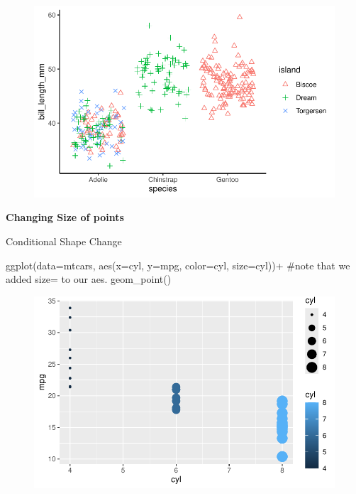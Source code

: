 \documentclass[
  letterpaper,
  DIV=11,
  numbers=noendperiod]{scrartcl}
\newenvironment{Shaded}{\begin{snugshade}}{\end{snugshade}}
\newcommand{\AttributeTok}[1]{\textcolor[rgb]{0.40,0.45,0.13}{#1}}
\newcommand{\CommentTok}[1]{\textcolor[rgb]{0.37,0.37,0.37}{#1}}
\newcommand{\FunctionTok}[1]{\textcolor[rgb]{0.28,0.35,0.67}{#1}}
\newcommand{\NormalTok}[1]{\textcolor[rgb]{0.00,0.23,0.31}{#1}}
\newcommand{\SpecialCharTok}[1]{\textcolor[rgb]{0.37,0.37,0.37}{#1}}
\begin{document}
\begin{figure}[H]

{\centering \includegraphics{Lab_2_files/figure-pdf/unnamed-chunk-30-1.pdf}

}

\end{figure}

\textbf{Changing Size of points}

Conditional Shape Change

\begin{Shaded}
\begin{Highlighting}[]
\FunctionTok{ggplot}\NormalTok{(}\AttributeTok{data=}\NormalTok{mtcars, }\FunctionTok{aes}\NormalTok{(}\AttributeTok{x=}\NormalTok{cyl, }\AttributeTok{y=}\NormalTok{mpg, }\AttributeTok{color=}\NormalTok{cyl, }\AttributeTok{size=}\NormalTok{cyl))}\SpecialCharTok{+} \CommentTok{\#note that we added \textquotesingle{}size=\textquotesingle{} to our aes. }
  \FunctionTok{geom\_point}\NormalTok{()}
\end{Highlighting}
\end{Shaded}

\begin{figure}[H]

{\centering \includegraphics{Lab_2_files/figure-pdf/unnamed-chunk-31-1.pdf}

}

\end{figure}
\end{document}
